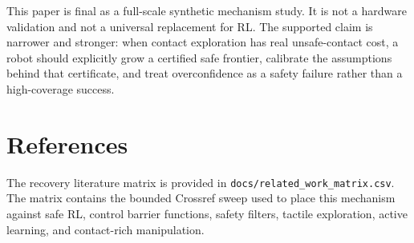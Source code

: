 \documentclass{article}
\begin{document}
This paper is final as a full-scale synthetic mechanism study. It is not a
hardware validation and not a universal replacement for RL. The supported claim
is narrower and stronger: when contact exploration has real unsafe-contact
cost, a robot should explicitly grow a certified safe frontier, calibrate the
assumptions behind that certificate, and treat overconfidence as a safety
failure rather than a high-coverage success.

\section*{References}
\small
The recovery literature matrix is provided in
\texttt{docs/related\_work\_matrix.csv}. The matrix contains the bounded
Crossref sweep used to place this mechanism against safe RL, control barrier
functions, safety filters, tactile exploration, active learning, and
contact-rich manipulation.
\end{document}
